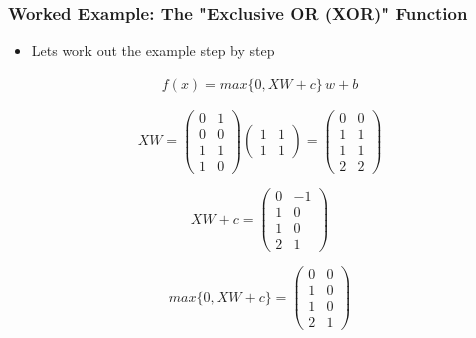 \documentclass[
  shownotes,
  xcolor={svgnames},
  hyperref={colorlinks,citecolor=DarkBlue,linkcolor=DarkRed,urlcolor=DarkBlue}
  , aspectratio=169]{beamer}
\begin{document}
\begin{frame}
\frametitle{Worked Example: The "Exclusive OR (XOR)" Function}

\begin{itemize}
\item Lets work out the example step by step
\end{itemize}
\begin{align}
f(x)=max\{0,XW+c\}\,w+b
\end{align}

\[
XW=\left(\begin{array}{cc}
0 & 1\\
0 & 0\\
1 & 1\\
1 & 0
\end{array}\right)\left(\begin{array}{cc}
1 & 1\\
1 & 1
\end{array}\right)=\left(\begin{array}{cc}
0 & 0\\
1 & 1\\
1 & 1\\
2 & 2
\end{array}\right)
\]

\[
XW+c=\left(\begin{array}{cc}
0 & -1\\
1 & 0\\
1 & 0\\
2 & 1
\end{array}\right)
\]

\[
max\{0,XW+c\}=\left(\begin{array}{cc}
0 & 0\\
1 & 0\\
1 & 0\\
2 & 1
\end{array}\right)
\]

\end{frame}
\end{document}
